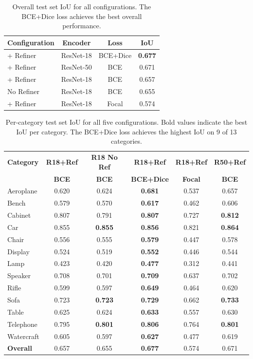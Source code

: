 \documentclass[10pt,twocolumn,letterpaper]{article}
\begin{document}
\begin{table}[t]
\centering
\caption{Overall test set IoU for all configurations. The BCE+Dice loss achieves the best overall performance.}
\label{tab:overall}
\begin{tabular}{@{}lccc@{}}
\toprule
\textbf{Configuration} & \textbf{Encoder} & \textbf{Loss} & \textbf{IoU} \\
\midrule
+ Refiner & ResNet-18 & BCE+Dice & \textbf{0.677} \\
+ Refiner & ResNet-50 & BCE & 0.671 \\
+ Refiner & ResNet-18 & BCE & 0.657 \\
No Refiner & ResNet-18 & BCE & 0.655 \\
+ Refiner & ResNet-18 & Focal & 0.574 \\
\bottomrule
\end{tabular}
\end{table}

\begin{table}[t]
\centering
\caption{Per-category test set IoU for all five configurations. Bold values indicate the best IoU per category. The BCE+Dice loss achieves the highest IoU on 9 of 13 categories.}
\label{tab:percategory}
\small
\begin{tabular}{@{}l*{5}{c}@{}}
\toprule
\textbf{Category} & \textbf{R18+Ref} & \textbf{R18 No Ref} & \textbf{R18+Ref} & \textbf{R18+Ref} & \textbf{R50+Ref} \\
 & \textbf{BCE} & \textbf{BCE} & \textbf{BCE+Dice} & \textbf{Focal} & \textbf{BCE} \\
\midrule
Aeroplane   & 0.620 & 0.624 & \textbf{0.681} & 0.537 & 0.657 \\
Bench       & 0.579 & 0.570 & \textbf{0.617} & 0.462 & 0.606 \\
Cabinet     & 0.807 & 0.791 & \textbf{0.807} & 0.727 & \textbf{0.812} \\
Car         & 0.855 & \textbf{0.855} & \textbf{0.856} & 0.821 & \textbf{0.864} \\
Chair       & 0.556 & 0.555 & \textbf{0.579} & 0.447 & 0.578 \\
Display     & 0.524 & 0.519 & \textbf{0.552} & 0.446 & 0.544 \\
Lamp        & 0.423 & 0.420 & \textbf{0.477} & 0.312 & 0.441 \\
Speaker     & 0.708 & 0.701 & \textbf{0.709} & 0.637 & 0.702 \\
Rifle       & 0.599 & 0.597 & \textbf{0.649} & 0.464 & 0.620 \\
Sofa        & 0.723 & \textbf{0.723} & \textbf{0.729} & 0.662 & \textbf{0.733} \\
Table       & 0.625 & 0.624 & \textbf{0.633} & 0.557 & 0.630 \\
Telephone   & 0.795 & \textbf{0.801} & \textbf{0.806} & 0.764 & \textbf{0.801} \\
Watercraft  & 0.605 & 0.597 & \textbf{0.627} & 0.477 & 0.619 \\
\midrule
\textbf{Overall} & 0.657 & 0.655 & \textbf{0.677} & 0.574 & 0.671 \\
\bottomrule
\end{tabular}
\end{table}
\end{document}
